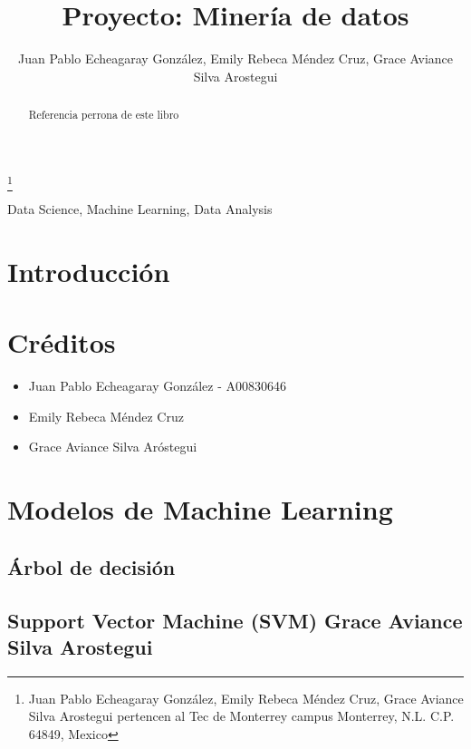 \documentclass[journal]{IEEEtran}                                                          %
\title{\LARGE \bf Proyecto: Minería de datos}
\author{Juan Pablo Echeagaray González, Emily Rebeca Méndez Cruz, Grace Aviance Silva Arostegui}%
\begin{document}
    \thanks{Juan Pablo Echeagaray González, Emily Rebeca Méndez Cruz, Grace Aviance Silva Arostegui pertencen al Tec de Monterrey campus Monterrey, N.L. C.P. 64849, Mexico {\tt\small}}

    \maketitle

    \thispagestyle{empty}
    \pagestyle{empty}
    \begin{abstract}
        Referencia perrona de este libro \cite{geron-2019}
    \end{abstract}

    \begin{IEEEkeywords} 
    Data Science, Machine Learning, Data Analysis
    \end{IEEEkeywords}

    \section{Introducción} \label{introduction}

    \section{Créditos} \label{credits}
       
        \begin{itemize}
            \item Juan Pablo Echeagaray González - A00830646
            \item Emily Rebeca Méndez Cruz
            \item Grace Aviance Silva Aróstegui
        \end{itemize}

    \section{Modelos de Machine Learning} \label{modelos}

        \subsection{Árbol de decisión} \label{decision-tree}
            \cite{sci-kit-learn-no-dateA}
        \subsection{Support Vector Machine (SVM) Grace Aviance Silva Arostegui} \label{svm}
            
\end{document}
